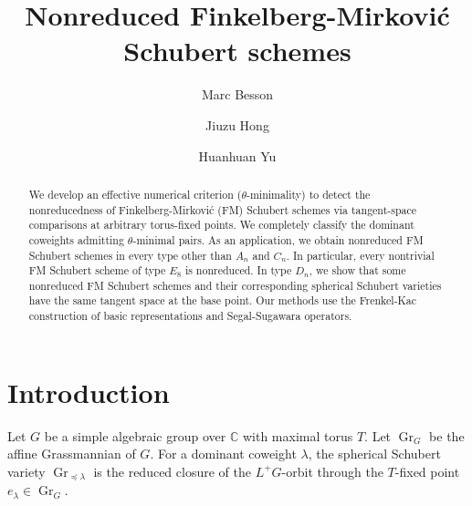 \documentclass[a4paper, 12pt]{amsart}
\theoremstyle{definition}
\newcommand{\C}{\mathbb C}
\DeclareMathOperator{\Gr}{\mathrm{Gr}}
\begin{document}
\title{Nonreduced Finkelberg-Mirkovi\'c Schubert schemes}
\author{Marc Besson}
	\address[M.Besson]{Shanghai Institute for Mathematics and Interdisciplinary Science, Shanghai, China}
	\author{Jiuzu Hong}
	\address[J.Hong]{Department of Mathematics, University of North Carolina at Chapel Hill, Chapel Hill, NC 27599-3250, U.S.A.}
	\author{Huanhuan Yu}
	\address[H.Yu]{Department of Mathematics, Jiangxi University of Finance and Economics, Nanchang, 330032, China}
	


\begin{abstract}

We develop an effective numerical criterion ($\theta$-minimality) to detect the nonreducedness of Finkelberg-Mirkovi\'c (FM) Schubert schemes  via tangent-space comparisons at arbitrary torus-fixed points.  We completely classify the dominant coweights admitting $\theta$-minimal pairs.  As an application, we obtain nonreduced FM Schubert schemes in every type other than $A_n$ and $C_n$. In particular, every nontrivial FM Schubert scheme of type $E_8$ is nonreduced. In type $D_n$, we show that some nonreduced FM Schubert schemes and their corresponding spherical Schubert varieties have the same tangent space at the base point. Our methods use the Frenkel-Kac construction of basic representations and Segal-Sugawara operators.
\end{abstract}
\maketitle

\setcounter{tocdepth}{2}
\tableofcontents

\section{Introduction}


Let $G$ be a simple algebraic group over $\C$ with
maximal torus $T$. Let $\Gr_G$ be the affine Grassmannian of $G$.  For a
dominant coweight $\lambda$, the spherical Schubert variety
$\Gr_{\preceq\lambda}$ is the reduced closure of the $L^+G$-orbit
through the $T$-fixed point $e_\lambda\in\Gr_G$. 
\end{document}
